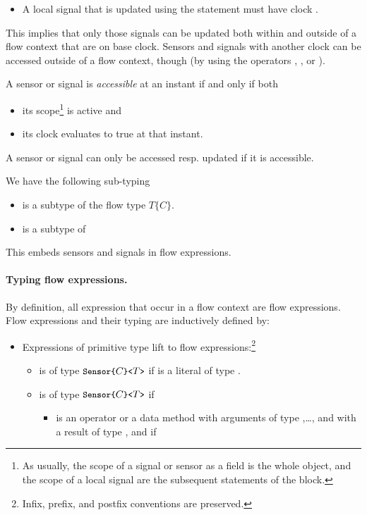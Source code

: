 {\begin{itemize}
\item A local signal that is updated using the \emph{} statement must have
clock \emph{}.
\end{itemize}
This implies that only those signals can be updated both within and outside
of a flow context that are on base clock. Sensors and signals with another
clock can be accessed outside of a flow context, though (by using the operators \emph{}, \emph{\pp{\$}}, or \emph{}).

A sensor or signal is \emph{accessible} at an instant if and only if both
\begin{itemize}
\item its scope\footnote{As usually, the scope of a signal or sensor as a field is the whole object, and the scope of a local signal are the subsequent statements of the block.} is active and 
\item its clock evaluates to true at that instant.
\end{itemize}
A sensor or signal can only be accessed resp. updated if it is accessible.

We have the following sub-typing
\begin{itemize}
\item \emph{} is a subtype of the flow type $T\{C\}$.
\item \emph{} is a subtype of \emph{}
\end{itemize}
This embeds sensors and signals in flow expressions.

\paragraph{Typing flow expressions.} By definition, all expression that occur in a flow context are flow expressions. Flow expressions and their typing are inductively defined by:
\begin{itemize}
    \item Expressions of primitive type lift to flow
    expressions:\footnote{Infix, prefix, and postfix conventions are
    preserved.}
    \begin{itemize}
		\item {} is of type $\texttt{\small{Sensor\{}}C\texttt{\small{\}<}}T\texttt{\small{>}}$
		if  is a literal of type .
		
		\item {} is of type
		$\texttt{\small{Sensor\{}}C\texttt{\small{\}<}}T\texttt{\small{>}}$ if
		\begin{itemize}
			\item {} is an operator or a data method with
			arguments of type ,\ldots,
			and with a result of type , and if


\end{itemize}
\end{itemize}
\end{itemize}}
